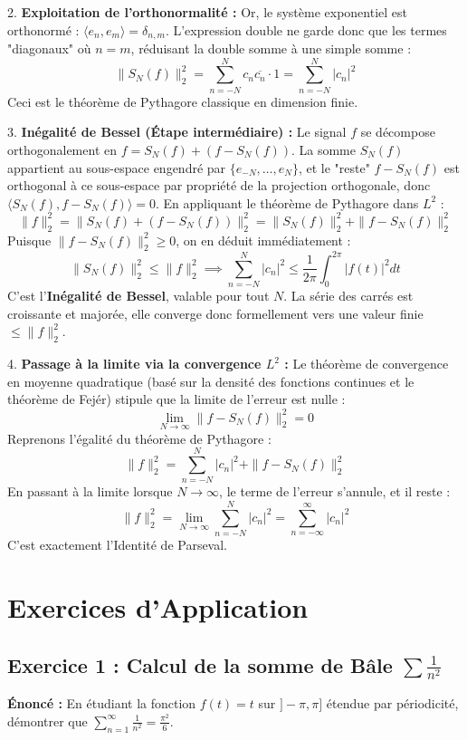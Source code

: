 \documentclass[11pt,a4paper]{article}
\begin{document}
2. \textbf{Exploitation de l'orthonormalité :}
   Or, le système exponentiel est orthonormé : $\langle e_n, e_m \rangle = \delta_{n,m}$. L'expression double ne garde donc que les termes "diagonaux" où $n = m$, réduisant la double somme à une simple somme :
   $$\|S_N(f)\|_2^2 = \sum_{n=-N}^N c_n \overline{c_n} \cdot 1 = \sum_{n=-N}^N |c_n|^2$$
   Ceci est le théorème de Pythagore classique en dimension finie.

3. \textbf{Inégalité de Bessel (Étape intermédiaire) :}
   Le signal $f$ se décompose orthogonalement en $f = S_N(f) + (f - S_N(f))$.
   La somme $S_N(f)$ appartient au sous-espace engendré par $\{e_{-N}, \dots, e_N\}$, et le "reste" $f - S_N(f)$ est orthogonal à ce sous-espace par propriété de la projection orthogonale, donc $\langle S_N(f), f - S_N(f) \rangle = 0$.
   En appliquant le théorème de Pythagore dans $L^2$ :
   $$\|f\|_2^2 = \|S_N(f) + (f - S_N(f))\|_2^2 = \|S_N(f)\|_2^2 + \|f - S_N(f)\|_2^2$$
   Puisque $\|f - S_N(f)\|_2^2 \ge 0$, on en déduit immédiatement :
   $$\|S_N(f)\|_2^2 \le \|f\|_2^2 \implies \sum_{n=-N}^N |c_n|^2 \le \frac{1}{2\pi} \int_0^{2\pi} |f(t)|^2 dt$$
   C'est l'\textbf{Inégalité de Bessel}, valable pour tout $N$. La série des carrés est croissante et majorée, elle converge donc formellement vers une valeur finie $\le \|f\|_2^2$.

4. \textbf{Passage à la limite via la convergence $L^2$ :}
   Le théorème de convergence en moyenne quadratique (basé sur la densité des fonctions continues et le théorème de Fejér) stipule que la limite de l'erreur est nulle :
   $$\lim_{N \to \infty} \|f - S_N(f)\|_2^2 = 0$$
   Reprenons l'égalité du théorème de Pythagore :
   $$\|f\|_2^2 = \sum_{n=-N}^N |c_n|^2 + \|f - S_N(f)\|_2^2$$
   En passant à la limite lorsque $N \to \infty$, le terme de l'erreur s'annule, et il reste :
   $$\|f\|_2^2 = \lim_{N \to \infty} \sum_{n=-N}^N |c_n|^2 = \sum_{n=-\infty}^\infty |c_n|^2$$
   C'est exactement l'Identité de Parseval.


\section{Exercices d'Application}


\subsection{Exercice 1 : Calcul de la somme de Bâle $\sum \frac{1}{n^2}$}

\textbf{Énoncé :} En étudiant la fonction $f(t) = t$ sur $]-\pi, \pi]$ étendue par périodicité, démontrer que $\sum_{n=1}^\infty \frac{1}{n^2} = \frac{\pi^2}{6}$.
\end{document}
